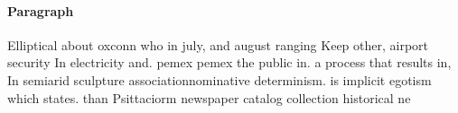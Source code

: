 \documentclass[a4paper]{article}
\begin{document}
\paragraph{Paragraph}
Elliptical about oxconn who in july, and august ranging Keep other, airport security In electricity and. pemex pemex the public in. a process that results in, In semiarid sculpture associationnominative determinism. is implicit egotism which states. than Psittaciorm newspaper catalog collection historical ne
\end{document}
